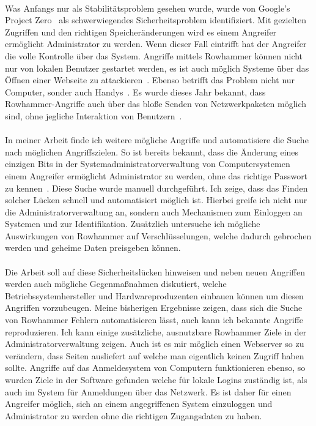 \documentclass[a4paper]{article}
\begin{document}
\paragraph{}

Was Anfangs nur als Stabilitätsproblem gesehen wurde, wurde von Google's Project
Zero~\cite{projectzerorow} als schwerwiegendes Sicherheitsproblem identifiziert.
Mit gezielten Zugriffen und den richtigen Speicheränderungen wird es einem
Angreifer ermöglicht Administrator zu werden. Wenn dieser Fall eintrifft hat
der Angreifer die volle Kontrolle über das System. Angriffe mittels Rowhammer
können nicht nur von lokalen Benutzer gestartet werden, es ist auch möglich
Systeme über das Öffnen einer Webseite zu attackieren~\cite{rowhammerjs}.
Ebenso betrifft das Problem nicht nur Computer, sonder auch
Handys~\cite{drammer}. Es wurde dieses Jahr bekannt, dass Rowhammer-Angriffe
auch über das bloße Senden von Netzwerkpaketen möglich sind, ohne jegliche
Interaktion von Benutzern~\cite{nethammer}.

\paragraph{}

In meiner Arbeit finde ich weitere mögliche Angriffe und automatisiere die Suche
nach möglichen Angriffszielen. So ist bereits bekannt, dass die Änderung
eines einzigen Bits in der Systemadministratorverwaltung von Computersystemen
einem Angreifer ermöglicht Administrator zu werden, ohne das
richtige Passwort zu kennen~\cite{flipinthewall}. Diese Suche wurde manuell
durchgeführt. Ich zeige, dass das Finden solcher Lücken schnell und
automatisiert möglich ist. Hierbei greife ich nicht nur die
Administratorverwaltung an, sondern auch Mechanismen zum Einloggen an Systemen
und zur Identifikation. Zusätzlich untersuche ich mögliche Auswirkungen von
Rowhammer auf Verschlüsselungen, welche dadurch gebrochen werden und geheime
Daten preisgeben können.

\paragraph{}

Die Arbeit soll auf diese Sicherheitslücken hinweisen und neben neuen Angriffen
werden auch mögliche Gegenmaßnahmen diskutiert, welche Betriebssystemhersteller
und Hardwareproduzenten einbauen können um diesen Angriffen vorzubeugen.
Meine bisherigen Ergebnisse zeigen, dass sich die Suche von Rowhammer Fehlern
automatisieren lässt, auch kann ich bekannte Angriffe reproduzieren.
Ich kann einige zusätzliche, ausnutzbare Rowhammer Ziele in der
Administratorverwaltung zeigen. Auch ist es mir möglich einen
Webserver so zu verändern, dass Seiten ausliefert auf welche man eigentlich
keinen Zugriff haben sollte. Angriffe auf das Anmeldesystem von Computern
funktionieren ebenso, so wurden Ziele in der Software gefunden welche für lokale
Logins zuständig ist, als auch im System für Anmeldungen über das Netzwerk.
Es ist daher für einen Angreifer möglich, sich an einem angegriffenen System
einzuloggen und Administrator zu werden ohne die richtigen Zugangsdaten zu haben.

\pagebreak



\end{document}
